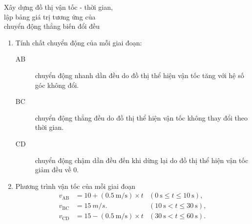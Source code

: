 \begin{dang}{Xây dựng đồ thị vận tốc - thời gian, \\lập bảng giá trị tương ứng của \\ chuyển động thẳng biến đổi đều}
{		\begin{enumerate}[label=\alph*.]
			\item Tính chất chuyển động của mỗi giai đoạn:
				\begin{description}
					\item[AB] chuyển động nhanh dần đều do đồ thị thể hiện vận tốc tăng với hệ số góc không đổi.
					\item[BC] chuyển động thẳng đều do đồ thị thể hiện vận tốc không thay đổi theo thời gian.
					\item[CD] chuyển động chậm dần đều đến khi dừng lại do đồ thị thể hiện vận tốc giảm đều về 0.
				\end{description}
			\item Phương trình vận tốc của mỗi giai đoạn	
				\begin{align*}
					v_\text{AB}& = 10 +(\SI{0.5}{\meter/\second})\times t&(\SI{0}{\second}\leq t \leq \SI{10}{\second}),\\
					v_\text{BC} &= \SI{15}{m/s}.&(\SI{10}{\second}<t\leq \SI{30}{\second}),\\
					v_\text{CD} &= 15 - (\SI{0.5}{\meter/\second})\times t & (\SI{30}{\second} < t \leq \SI{60}{\second}).
				\end{align*}
		\end{enumerate}

	}
	
\end{dang}
